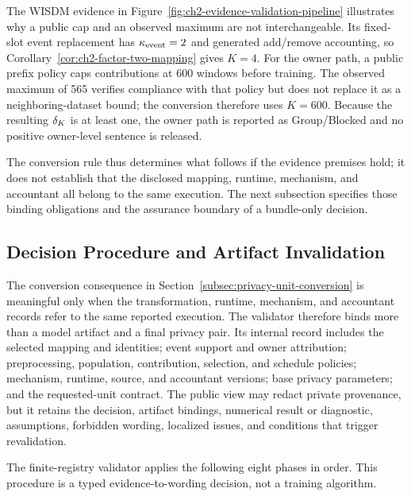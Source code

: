 The WISDM evidence in Figure~\ref{fig:ch2-evidence-validation-pipeline}
illustrates why a public cap and an observed maximum are not interchangeable.  Its
fixed-slot event replacement has \(\kappa_{\mathrm{event}}=2\) and generated add/remove
accounting, so Corollary~\ref{cor:ch2-factor-two-mapping} gives \(K=4\).  For the
owner path, a public prefix policy caps contributions at 600 windows before
training.  The observed maximum of 565 verifies compliance with that policy but
does not replace it as a neighboring-dataset bound; the conversion therefore uses
\(K=600\).  Because the resulting \(\delta_{K}\) is at least one, the owner
path is reported as \textsf{Group}/\textsf{Blocked} and no positive owner-level
sentence is released.

The conversion rule thus determines what follows if the evidence premises hold;
it does not establish that the disclosed mapping, runtime, mechanism, and
accountant all belong to the same execution.  The next subsection specifies those
binding obligations and the assurance boundary of a bundle-only decision.

\subsection{Decision Procedure and Artifact Invalidation}
\label{subsec:evidence-binding-boundary}

The conversion consequence in Section~\ref{subsec:privacy-unit-conversion} is
meaningful only when the transformation, runtime, mechanism, and accountant
records refer to the same reported execution.  The validator therefore binds more
than a model artifact and a final privacy pair.  Its internal record includes the
selected mapping and identities; event support and owner attribution;
preprocessing, population, contribution, selection, and schedule policies;
mechanism, runtime, source, and accountant versions; base privacy parameters; and
the requested-unit contract.  The public view may redact private provenance, but
it retains the decision, artifact bindings, numerical result or diagnostic,
assumptions, forbidden wording, localized issues, and conditions that trigger
revalidation.

The finite-registry validator applies the following eight phases in order.  This
procedure is a typed evidence-to-wording decision, not a training algorithm.

